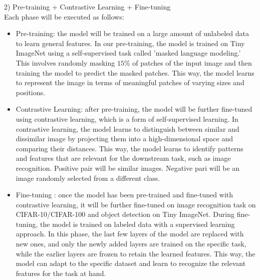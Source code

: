 2) Pre-training + Contrastive Learning + Fine-tuning
\\
Each phase will be executed as follows:
\begin{itemize}
    \item Pre-training: the model will be trained on a large amount of unlabeled data to learn general features. In our pre-training, the model is trained on Tiny ImageNet using a self-supervised task called 'masked language modeling.' This involves randomly masking $15\%$ of patches of the input image and then training the model to predict the masked patches. This way, the model learns to represent the image in terms of meaningful patches of varying sizes and positions.

    \item Contrastive Learning: after pre-training, the model will be further fine-tuned using contrastive learning, which is a form of self-supervised learning. In contrastive learning, the model learns to distinguish between similar and dissimilar image by projecting them into a high-dimensional space and comparing their distances. This way, the model learns to identify patterns and features that are relevant for the downstream task, such as image recognition.
    Positive pair will be similar images.
    Negative pari will be an image randomly selected from a different class.

    \item Fine-tuning : once the model has been pre-trained and fine-tuned with contrastive learning, it will be further fine-tuned on image recognition task on CIFAR-10/CIFAR-100 and object detection on Tiny ImageNet. During fine-tuning, the model is trained on labeled data with a supervised learning approach. In this phase, the last few layers of the model are replaced with new ones, and only the newly added layers are trained on the specific task, while the earlier layers are frozen to retain the learned features. This way, the model can adapt to the specific dataset and learn to recognize the relevant features for the task at hand.
\end{itemize}